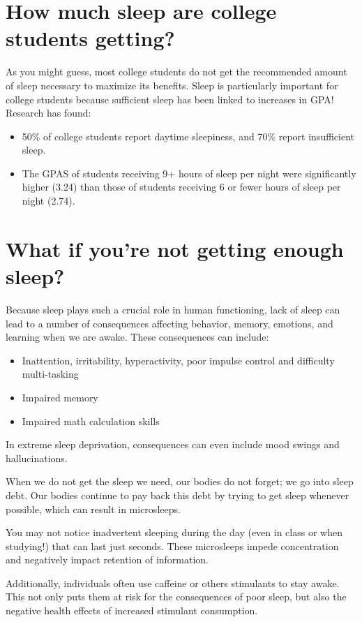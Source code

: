 \documentclass[../main.tex]{subfiles}
\begin{document}
\section{How much sleep are college students getting?}
As you might guess, most college students do not get the recommended amount of
sleep necessary to maximize its benefits. Sleep is particularly important for
college students because sufficient sleep has been linked to increases in GPA!
Research has found:
%
\begin{itemize}
  \item 50\% of college students report daytime sleepiness, and 70\% report
    insufficient sleep.
  \item The GPAS of students receiving 9+ hours of sleep per night were
    significantly higher (3.24) than those of students receiving 6 or fewer
    hours of sleep per night (2.74).
\end{itemize}
%
\section{What if you're not getting enough sleep?}
Because sleep plays such a crucial role in human functioning, lack of sleep can
lead to a number of consequences affecting behavior, memory, emotions, and
learning when we are awake. These consequences can include:
%
\begin{itemize}
  \item Inattention, irritability, hyperactivity, poor impulse control and
    difficulty multi-tasking
  \item Impaired memory
  \item Impaired math calculation skills
\end{itemize}
%
In extreme sleep deprivation, consequences can even include mood swings and
hallucinations.

When we do not get the sleep we need, our bodies do not forget; we go into sleep
debt. Our bodies continue to pay back this debt by trying to get sleep whenever
possible, which can result in microsleeps.

You may not notice inadvertent sleeping during the day (even in class or when
studying!) that can last just seconds. These microsleeps impede concentration
and negatively impact retention of information.

Additionally, individuals often use caffeine or others stimulants to stay awake.
This not only puts them at risk for the consequences of poor sleep, but also the
negative health effects of increased stimulant consumption.
%
\end{document}
